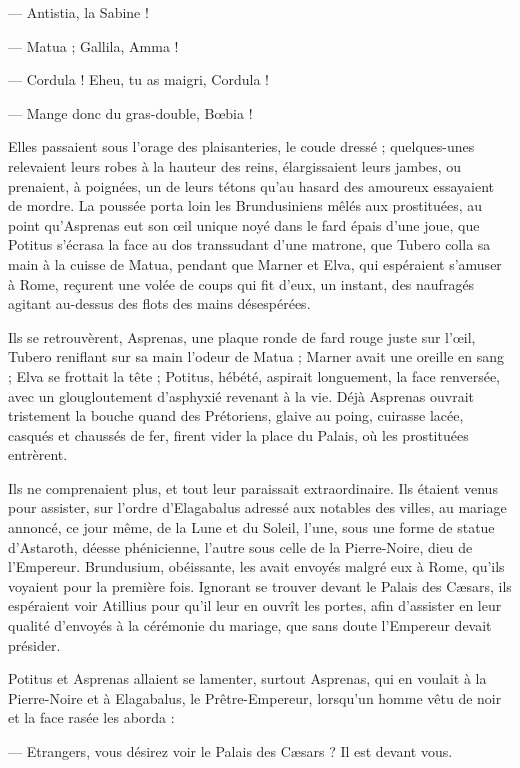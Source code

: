 \documentclass[a4paper, 11pt, oneside, polutonikogreek, french]{article}
\begin{document}
--- Antistia, la Sabine !

--- Matua ; Gallila, Amma !

--- Cordula ! Eheu, tu as maigri, Cordula !

--- Mange donc du gras-double, Bœbia !

Elles passaient sous l'orage des plaisanteries, le coude dressé ; quelques-unes relevaient leurs robes à la hauteur des reins, élargissaient leurs jambes, ou prenaient, à poignées, un de leurs tétons qu'au hasard des amoureux essayaient de mordre. La poussée porta loin les Brundusiniens mêlés aux prostituées, au point qu'Asprenas eut son œil unique noyé dans le fard épais d'une joue, que Potitus s'écrasa la face au dos transsudant d'une matrone, que Tubero colla sa main à la cuisse de Matua, pendant que Marner et Elva, qui espéraient s'amuser à Rome, reçurent une volée de coups qui fit d'eux, un instant, des naufragés agitant au-dessus des flots des mains désespérées.

Ils se retrouvèrent, Asprenas, une plaque ronde de fard rouge juste sur l'œil, Tubero reniflant sur sa main l'odeur de Matua ; Marner avait une oreille en sang ; Elva se frottait la tête ; Potitus, hébété, aspirait longuement, la face renversée, avec un glougloutement d'asphyxié revenant à la vie. Déjà Asprenas ouvrait tristement la bouche quand des Prétoriens, glaive au poing, cuirasse lacée, casqués et chaussés de fer, firent vider la place du Palais, où les prostituées entrèrent.

Ils ne comprenaient plus, et tout leur paraissait extraordinaire. Ils étaient venus pour assister, sur l'ordre d'Elagabalus adressé aux notables des villes, au mariage annoncé, ce jour même, de la Lune et du Soleil, l'une, sous une forme de statue d'Astaroth, déesse phénicienne, l'autre sous celle de la Pierre-Noire, dieu de l'Empereur. Brundusium, obéissante, les avait envoyés malgré eux à Rome, qu'ils voyaient pour la première fois. Ignorant se trouver devant le Palais des Cæsars, ils espéraient voir Atillius pour qu'il leur en ouvrît les portes, afin d'assister en leur qualité d'envoyés à la cérémonie du mariage, que sans doute l'Empereur devait présider.

Potitus et Asprenas allaient se lamenter, surtout Asprenas, qui en voulait à la Pierre-Noire et à Elagabalus, le Prêtre-Empereur, lorsqu'un homme vêtu de noir et la face rasée les aborda :

--- Etrangers, vous désirez voir le Palais des Cæsars ? Il est devant vous.
\end{document}
